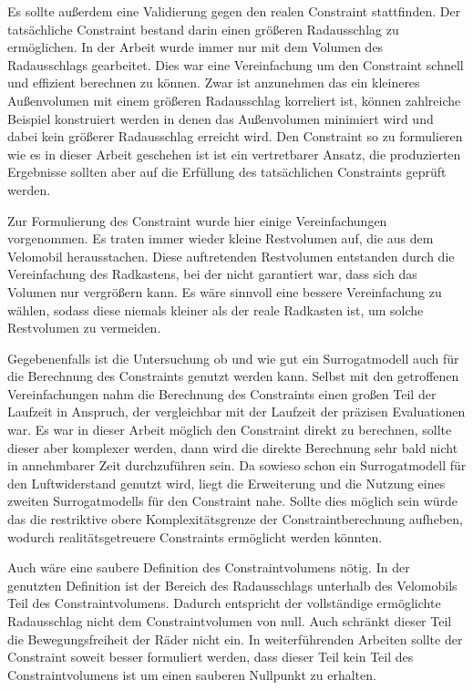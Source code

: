 Es sollte außerdem eine Validierung gegen den realen Constraint stattfinden.
Der tatsächliche Constraint bestand darin einen größeren Radausschlag zu ermöglichen.
In der Arbeit wurde immer nur mit dem Volumen des Radausschlags gearbeitet.
Dies war eine Vereinfachung um den Constraint schnell und effizient berechnen zu können.
Zwar ist anzunehmen das ein kleineres Außenvolumen mit einem größeren Radausschlag korreliert ist, können zahlreiche Beispiel konstruiert werden in denen das Außenvolumen minimiert wird und dabei kein größerer Radausschlag erreicht wird.
Den Constraint so zu formulieren wie es in dieser Arbeit geschehen ist ist ein vertretbarer Ansatz, die produzierten Ergebnisse sollten aber auf die Erfüllung des tatsächlichen Constraints geprüft werden.

Zur Formulierung des Constraint wurde hier einige Vereinfachungen vorgenommen.
Es traten immer wieder kleine Restvolumen auf, die aus dem Velomobil herausstachen.
Diese auftretenden Restvolumen entstanden durch die Vereinfachung des Radkastens, bei der nicht garantiert war, dass sich das Volumen nur vergrößern kann.
Es wäre sinnvoll eine bessere Vereinfachung zu wählen, sodass diese niemals kleiner als der reale Radkasten ist, um solche Restvolumen zu vermeiden.

Gegebenenfalls ist die Untersuchung ob und wie gut ein Surrogatmodell auch für die Berechnung des Constraints genutzt werden kann.
Selbst mit den getroffenen Vereinfachungen nahm die Berechnung des Constraints einen großen Teil der Laufzeit in Anspruch, der vergleichbar mit der Laufzeit der präzisen Evaluationen war.
Es war in dieser Arbeit möglich den Constraint direkt zu berechnen, sollte dieser aber komplexer werden, dann wird die direkte Berechnung sehr bald nicht in annehmbarer Zeit durchzuführen sein.
Da sowieso schon ein Surrogatmodell für den Luftwiderstand genutzt wird, liegt die Erweiterung und die Nutzung eines zweiten Surrogatmodells für den Constraint nahe.
Sollte dies möglich sein würde das die restriktive obere Komplexitätsgrenze der Constraintberechnung aufheben, wodurch realitätsgetreuere Constraints ermöglicht werden könnten. 

Auch wäre eine saubere Definition des Constraintvolumens nötig.
In der genutzten Definition ist der Bereich des Radausschlags unterhalb des Velomobils Teil des Constraintvolumens.
Dadurch entspricht der vollständige ermöglichte Radausschlag nicht dem Constraintvolumen von null.
Auch schränkt dieser Teil die Bewegungsfreiheit der Räder nicht ein.
In weiterführenden Arbeiten sollte der Constraint soweit besser formuliert werden, dass dieser Teil kein Teil des Constraintvolumens ist um einen sauberen Nullpunkt zu erhalten.

